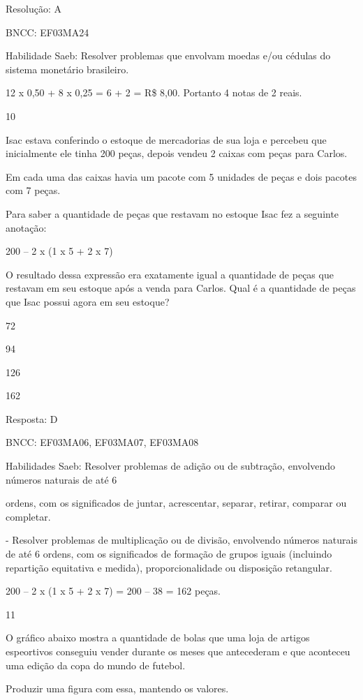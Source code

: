 \begin{escolha}
\begin{escolha}
Resolução: A

BNCC: EF03MA24

Habilidade Saeb: Resolver problemas que envolvam moedas e/ou cédulas do
sistema monetário brasileiro.

12 x 0,50 + 8 x 0,25 = 6 + 2 = R\$ 8,00. Portanto 4 notas de 2 reais.

\num{10}

Isac estava conferindo o estoque de mercadorias de sua loja e percebeu
que inicialmente ele tinha 200 peças, depois vendeu 2 caixas com peças
para Carlos.

Em cada uma das caixas havia um pacote com 5 unidades de peças e dois
pacotes com 7 peças.

Para saber a quantidade de peças que restavam no estoque Isac fez a
seguinte anotação:

200 -- 2 x (1 x 5 + 2 x 7)

O resultado dessa expressão era exatamente igual a quantidade de peças
que restavam em seu estoque após a venda para Carlos. Qual é a
quantidade de peças que Isac possui agora em seu estoque?

\begin{escolha}
\item
  72
\item
  94
\item
  126
\item
  162
\end{escolha}

Resposta: D

BNCC: EF03MA06, EF03MA07, EF03MA08

Habilidades Saeb: Resolver problemas de adição ou de subtração,
envolvendo números naturais de até 6

ordens, com os significados de juntar, acrescentar, separar, retirar,
comparar ou completar.

- Resolver problemas de multiplicação ou de divisão, envolvendo números
naturais de até 6 ordens, com os significados de formação de grupos
iguais (incluindo repartição equitativa e medida), proporcionalidade ou
disposição retangular.

200 -- 2 x (1 x 5 + 2 x 7) = 200 -- 38 = 162 peças.

\num{11}

O gráfico abaixo mostra a quantidade de bolas que uma loja de artigos
espeortivos conseguiu vender durante os meses que antecederam e que
aconteceu uma edição da copa do mundo de futebol.

Produzir uma figura com essa, mantendo os valores.


\end{escolha}
\end{escolha}
